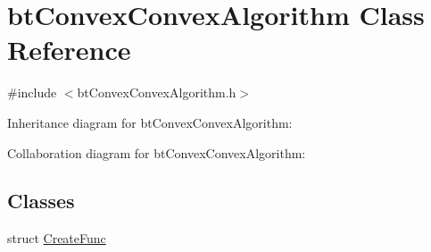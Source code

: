\hypertarget{classbt_convex_convex_algorithm}{\section{bt\+Convex\+Convex\+Algorithm Class Reference}
\label{classbt_convex_convex_algorithm}
}


{\ttfamily \#include $<$bt\+Convex\+Convex\+Algorithm.\+h$>$}



Inheritance diagram for bt\+Convex\+Convex\+Algorithm\+:


Collaboration diagram for bt\+Convex\+Convex\+Algorithm\+:
\subsection*{Classes}
\begin{DoxyCompactItemize}
\item 
struct \hyperlink{structbt_convex_convex_algorithm_1_1_create_func}{Create\+Func}
\end{DoxyCompactItemize}
